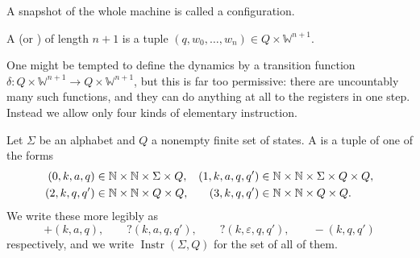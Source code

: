 \documentclass[a4paper]{scrartcl}
\newcommand{\WW}{\mathbb{W}}
\newcommand{\Instr}{\operatorname{Instr}}
\newcommand{\eps}{\varepsilon}
\begin{document}
\begin{center}
\end{center}

A snapshot of the whole machine is called a configuration.

\begin{definition}[Configuration]
	A  (or ) of length $n+1$ is a tuple $(q, w_0, \dots, w_n) \in Q \times \WW^{n+1}$.
\end{definition}

One might be tempted to define the dynamics by a transition function $\delta \colon Q \times \WW^{n+1} \to Q \times \WW^{n+1}$, but this is far too permissive: there are uncountably many such functions, and they can do anything at all to the registers in one step. Instead we allow only four kinds of elementary instruction.

\begin{definition}[Instruction]
	Let $\Sigma$ be an alphabet and $Q$ a nonempty finite set of states. A  is a tuple of one of the forms
	\begin{align*}
		(0,k,a,q) &\in \mathbb{N}\times\mathbb{N}\times\Sigma\times Q, &  (1,k,a,q,q') &\in \mathbb{N}\times\mathbb{N}\times\Sigma\times Q\times Q, \\
		(2,k,q,q') &\in \mathbb{N}\times\mathbb{N}\times Q\times Q, & (3,k,q,q') &\in \mathbb{N}\times\mathbb{N}\times Q\times Q.
	\end{align*}
	We write these more legibly as
	$$+(k,a,q), \qquad ?(k,a,q,q'), \qquad ?(k,\eps,q,q'), \qquad -(k,q,q')$$
	respectively, and we write $\Instr(\Sigma,Q)$ for the set of all of them.
\end{definition}
\end{document}
